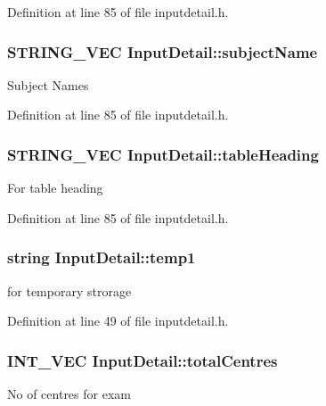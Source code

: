 \-Definition at line 85 of file inputdetail.\-h.

\hypertarget{classInputDetail_a860676e6e8b258a4cf6265e693194e93}{
\subsubsection[{subject\-Name}]{\setlength{\rightskip}{0pt plus 5cm}\-S\-T\-R\-I\-N\-G\-\_\-\-V\-E\-C {\bf \-Input\-Detail\-::subject\-Name}}}\label{classInputDetail_a860676e6e8b258a4cf6265e693194e93}
\-Subject \-Names 

\-Definition at line 85 of file inputdetail.\-h.

\hypertarget{classInputDetail_a9adc25a6c332855ee0c2dbd5fd71ca86}{
\subsubsection[{table\-Heading}]{\setlength{\rightskip}{0pt plus 5cm}\-S\-T\-R\-I\-N\-G\-\_\-\-V\-E\-C {\bf \-Input\-Detail\-::table\-Heading}}}\label{classInputDetail_a9adc25a6c332855ee0c2dbd5fd71ca86}
\-For table heading 

\-Definition at line 85 of file inputdetail.\-h.

\hypertarget{classInputDetail_aa5659e496977cc83f743725f6aaf2d6a}{
\subsubsection[{temp1}]{\setlength{\rightskip}{0pt plus 5cm}string {\bf \-Input\-Detail\-::temp1}}}\label{classInputDetail_aa5659e496977cc83f743725f6aaf2d6a}
for temporary strorage 

\-Definition at line 49 of file inputdetail.\-h.

\hypertarget{classInputDetail_a11f9eb0c33682bf3c9b1e2cac50ebaad}{
\subsubsection[{total\-Centres}]{\setlength{\rightskip}{0pt plus 5cm}\-I\-N\-T\-\_\-\-V\-E\-C {\bf \-Input\-Detail\-::total\-Centres}}}\label{classInputDetail_a11f9eb0c33682bf3c9b1e2cac50ebaad}
\-No of centres for exam 


